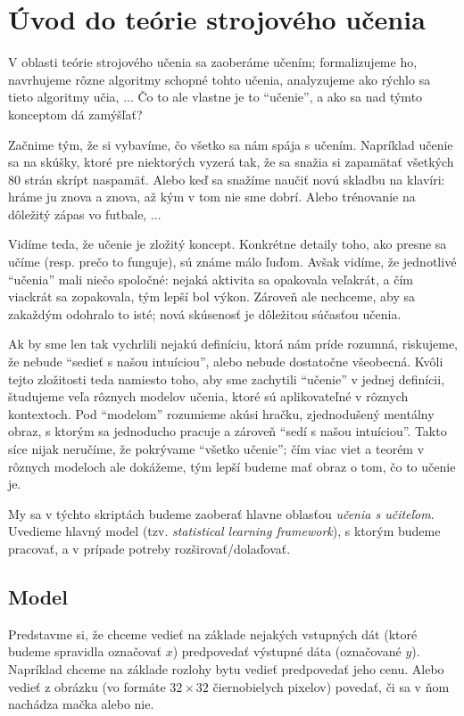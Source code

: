 \chapter{Úvod do teórie strojového učenia}

V oblasti teórie strojového učenia sa zaoberáme učením; formalizujeme ho,
navrhujeme rôzne algoritmy schopné tohto učenia, analyzujeme ako rýchlo
sa tieto algoritmy učia, ... Čo to ale vlastne je to ``učenie'', a ako sa
nad týmto konceptom dá zamýšľať?

Začnime tým, že si vybavíme, čo všetko sa nám spája s učením. Napríklad
učenie sa na skúšky, ktoré pre niektorých vyzerá tak, že sa snažia si
zapamätať všetkých $80$ strán skrípt naspamäť. Alebo keď sa snažíme
naučiť novú skladbu na klavíri: hráme ju znova a znova, až kým v tom
nie sme dobrí. Alebo trénovanie na dôležitý zápas vo futbale, ...

Vidíme teda, že učenie je zložitý koncept. Konkrétne detaily toho, ako
presne sa učíme (resp. prečo to funguje), sú známe málo ľuďom. Avšak
vidíme, že jednotlivé ``učenia'' mali niečo spoločné: nejaká aktivita
sa opakovala veľakrát, a čím viackrát sa zopakovala, tým lepší bol
výkon. Zároveň ale nechceme, aby sa zakaždým odohralo to isté; nová
skúsenosť je dôležitou súčasťou učenia.

Ak by sme len tak vychrlili nejakú definíciu, ktorá nám príde rozumná,
riskujeme, že nebude ``sedieť s našou intuíciou'', alebo nebude dostatočne
všeobecná. Kvôli tejto zložitosti teda namiesto toho, aby sme zachytili
``učenie'' v jednej definícii, študujeme veľa rôznych modelov učenia,
ktoré sú aplikovateľné v rôznych kontextoch. Pod ``modelom'' rozumieme
akúsi hračku, zjednodušený mentálny obraz, s ktorým sa jednoducho pracuje
a zároveň ``sedí s našou intuíciou''. Takto síce nijak neručíme, že pokrývame
``všetko učenie''; čím viac viet a teorém v rôznych modeloch ale dokážeme,
tým lepší budeme mať obraz o tom, čo to učenie je.

My sa v týchto skriptách budeme zaoberať hlavne oblasťou \emph{učenia s
učiteľom}. Uvedieme hlavný model (tzv. \emph{statistical learning framework}),
s ktorým budeme pracovať, a v prípade potreby rozširovať/dolaďovať.




\section{Model} \label{ch1:stat_lr_fw}

Predstavme si, že chceme vedieť na základe nejakých vstupných dát (ktoré
budeme spravidla označovať $x$) predpovedať výstupné dáta (označované $y$).
Napríklad chceme na základe rozlohy bytu vedieť predpovedať jeho cenu.
Alebo vedieť z obrázku (vo formáte $32 \times 32$ čiernobielych pixelov)
povedať, či sa v ňom nachádza mačka alebo nie.

